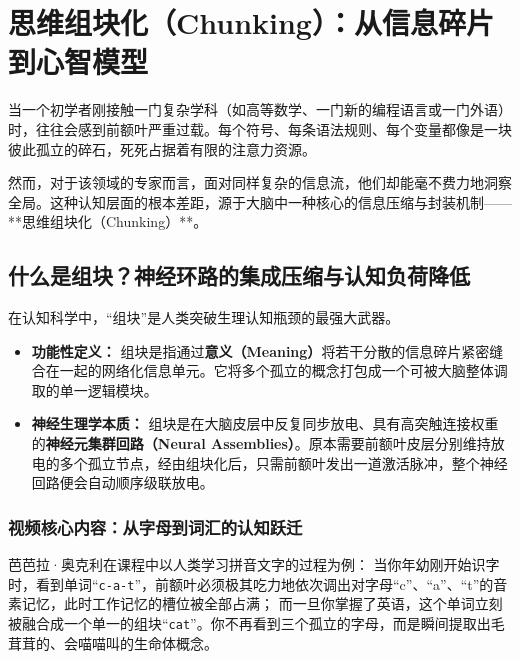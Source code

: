 \documentclass[12pt,a4paper,openany]{ctexbook}
\begin{document}
\chapter{思维组块化（Chunking）：从信息碎片到心智模型}

当一个初学者刚接触一门复杂学科（如高等数学、一门新的编程语言或一门外语）时，往往会感到前额叶严重过载。每个符号、每条语法规则、每个变量都像是一块彼此孤立的碎石，死死占据着有限的注意力资源。

然而，对于该领域的专家而言，面对同样复杂的信息流，他们却能毫不费力地洞察全局。这种认知层面的根本差距，源于大脑中一种核心的信息压缩与封装机制——**思维组块化（Chunking）**。

\section{什么是组块？神经环路的集成压缩与认知负荷降低}

在认知科学中，“组块”是人类突破生理认知瓶颈的最强大武器。

\begin{keypoint}[组块的定义与神经本质]
\begin{itemize}
    \item \textbf{功能性定义：} 组块是指通过\textbf{意义（Meaning）}将若干分散的信息碎片紧密缝合在一起的网络化信息单元。它将多个孤立的概念打包成一个可被大脑整体调取的单一逻辑模块。
    \item \textbf{神经生理学本质：} 组块是在大脑皮层中反复同步放电、具有高突触连接权重的\textbf{神经元集群回路（Neural Assemblies）}。原本需要前额叶皮层分别维持放电的多个孤立节点，经由组块化后，只需前额叶发出一道激活脉冲，整个神经回路便会自动顺序级联放电。
\end{itemize}
\end{keypoint}

\subsection*{视频核心内容：从字母到词汇的认知跃迁}

芭芭拉·奥克利在课程中以人类学习拼音文字的过程为例：
当你年幼刚开始识字时，看到单词“\texttt{c-a-t}”，前额叶必须极其吃力地依次调出对字母“c”、“a”、“t”的音素记忆，此时工作记忆的槽位被全部占满；
而一旦你掌握了英语，这个单词立刻被融合成一个单一的组块“\texttt{cat}”。你不再看到三个孤立的字母，而是瞬间提取出毛茸茸的、会喵喵叫的生命体概念。
\end{document}
